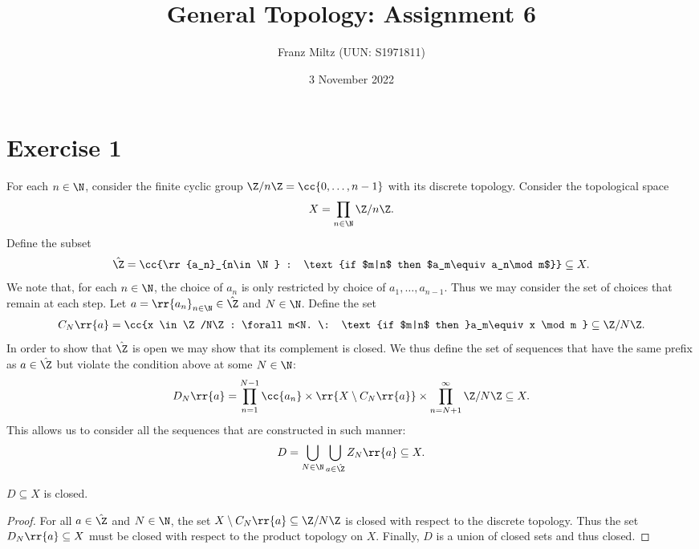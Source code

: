 \documentclass{article}
\begin{document}
\title{General Topology: Assignment 6}
\author{Franz Miltz (UUN: S1971811)}
\date{3 November 2022}
\maketitle

\section*{Exercise 1}

For each $n\in\N$, consider the finite cyclic group $\Z/n\Z=\cc{0,\ldots,n-1}$ with
its discrete topology. Consider the topological space
\begin{align*}
  X=\prod_{n\in\N} \Z/n\Z.
\end{align*}
Define the subset
\begin{align*}
  \hat\Z = \cc{\rr{a_n}_{n\in\N} : \text{if $m|n$ then $a_m\equiv a_n\mod m$}} \subseteq X.
\end{align*}
We note that, for each $n\in\N$, the choice of $a_n$ is only restricted by choice of
$a_1,\ldots,a_{n-1}$. Thus we may consider the set of choices that remain at each step.
Let $a=\rr{a_n}_{n\in\N}\in\hat\Z$ and $N\in\N$. Define the set
\begin{align*}
  C_N\rr{a} = \cc{x \in \Z/N\Z : \forall m<N. \: \text{if $m|n$ then }a_m\equiv x \mod m }\subseteq \Z/N\Z.
\end{align*}
In order to show that $\hat\Z$ is open we may show that its complement is closed. We thus define the
set of sequences that have the same prefix as $a\in\hat\Z$ but violate the condition above
at some $N\in\N$:
\begin{align*}
  D_N\rr{a}=\prod_{n=1}^{N-1}\cc{a_n}\times\rr{X\setminus C_N\rr{a}}\times \prod_{n=N+1}^{\infty} \Z/N\Z \subseteq X.
\end{align*}
This allows us to consider all the sequences that are constructed in such manner:
\begin{align*}
  D = \bigcup_{N\in\N}\bigcup_{a\in\hat\Z} Z_N\rr{a} \subseteq X.
\end{align*}

\begin{claim*}
  $D\subseteq X$ is closed.
  \begin{proof}
    For all $a\in\hat\Z$ and $N\in\N$, the set $X\setminus C_N\rr{a}\subseteq \Z/N\Z$ is closed with
    respect to the discrete topology. Thus the set $D_N\rr{a}\subseteq X$ must be closed
    with respect to the product topology on $X$. Finally, $D$ is a union of closed sets and
    thus closed.
  \end{proof}
\end{claim*}
\end{document}
